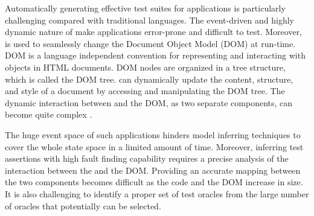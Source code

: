Automatically generating effective test suites for \javascript applications is particularly challenging compared with traditional languages.
The event-driven and highly dynamic nature of \javascript make \javascript applications error-prone \cite{Ocariza:esem2013} and difficult to test.
Moreover, \javascript is used to seamlessly change the Document Object Model (DOM) at run-time.
DOM is a language independent convention for representing and interacting with objects in HTML documents. DOM nodes are organized in a tree structure, which is called the DOM tree. 
\javascript can dynamically update the content, structure, and style of a document by accessing and manipulating the DOM tree. 
The dynamic interaction between \javascript and the DOM, as two separate components, can become quite complex \cite{Ocariza:esem2013}. 

The huge event space of such applications hinders model inferring techniques to cover the whole state space in a limited amount of time. Moreover, inferring test assertions with high fault finding capability requires a precise analysis of the interaction between the \javascript and the DOM. 
Providing an accurate mapping between the two components becomes difficult as the \javascript code and the DOM increase in size. It is also challenging to identify a proper set of test oracles from the large number of oracles that potentially can be selected.


